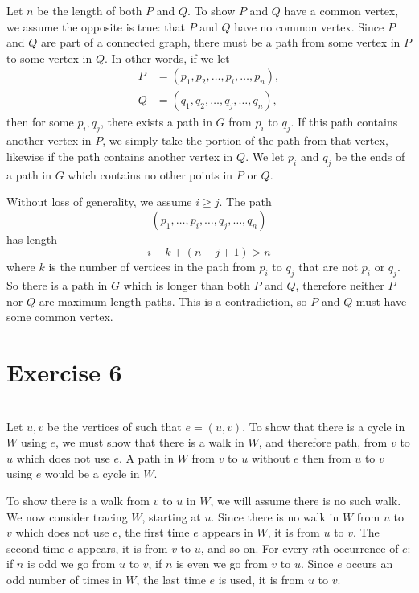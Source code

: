\documentclass[12pt]{article}
\begin{document}
Let $n$ be the length of both $P$ and $Q$. To show $P$ and $Q$ have a common vertex, we assume the opposite is true: that $P$ and $Q$ have no common vertex. Since $P$ and $Q$ are part of a connected graph, there must be a path from some vertex in $P$ to some vertex in $Q$. In other words, if we let
\begin{align*}
    P &= (p_1, p_2, \dots, p_i, \dots, p_n), \\
    Q &= (q_1, q_2, \dots, q_j, \dots, q_n),
\end{align*}
then for some $p_i, q_j$, there exists a path in $G$ from $p_i$ to $q_j$. If this path contains another vertex in $P$, we simply take the portion of the path from that vertex, likewise if the path contains another vertex in $Q$. We let $p_i$ and $q_j$ be the ends of a path in $G$ which contains no other points in $P$ or $Q$.

Without loss of generality, we assume $i\geq j$. The path
\[(p_1, \dots, p_i, \dots, q_j, \dots, q_n)\]
has length
\[i + k + (n-j+1) > n \]
where $k$ is the number of vertices in the path from $p_i$ to $q_j$ that are not $p_i$ or $q_j$. So there is a path in $G$ which is longer than both $P$ and $Q$, therefore neither $P$ nor $Q$ are maximum length paths. This is a contradiction, so $P$ and $Q$ must have some common vertex.


\section*{Exercise 6}
\\

Let $u,v$ be the vertices of such that $e=(u,v)$. To show that there is a cycle in $W$ using $e$, we must show that there is a walk in $W$, and therefore path, from $v$ to $u$ which does not use $e$. A path in $W$ from $v$ to $u$ without $e$ then from $u$ to $v$ using $e$ would be a cycle in $W$.

To show there is a walk from $v$ to $u$ in $W$, we will assume there is no such walk. We now consider tracing $W$, starting at $u$. Since there is no walk in $W$ from $u$ to $v$ which does not use $e$, the first time $e$ appears in $W$, it is from $u$ to $v$. The second time $e$ appears, it is from $v$ to $u$, and so on. For every $n$th occurrence of $e$: if $n$ is odd we go from $u$ to $v$, if $n$ is even we go from $v$ to $u$. Since $e$ occurs an odd number of times in $W$, the last time $e$ is used, it is from $u$ to $v$.
\end{document}

